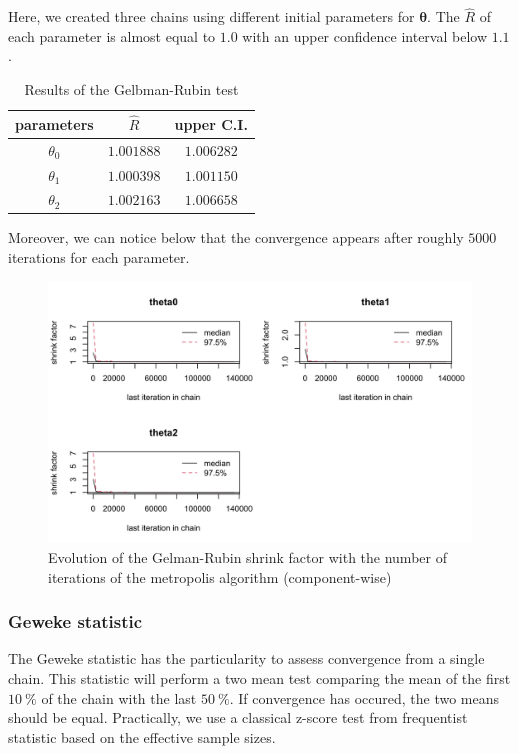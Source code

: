 Here, we created three chains using different initial parameters for $\bm{\theta}$. The $\hat{R}$ of each parameter is almost equal to $1.0$ with an upper confidence interval below $1.1$.

\begin{table}[H]
	\centering\begin{tabular}{|c|c|c|} \hline 
		parameters & $\hat{R}$ & upper C.I. \\ \hline
		$\theta_0$ & $1.001888$ & $1.006282$ \\
		$\theta_1$ & $1.000398$ & $1.001150$ \\
		$\theta_2$ & $1.002163$ & $1.006658$ \\ \hline
	\end{tabular}
	\caption{Results of the Gelbman-Rubin test}
	\label{tab:metropolis-cw-gelman-rubin}
\end{table}

Moreover, we can notice below that the convergence appears after roughly $5000$ iterations for each parameter.

\begin{figure}[H]
	\centering
	\includegraphics{figures/metropolis_cw/metropolis_cw_gelman-plot.png}
	\caption{Evolution of the Gelman-Rubin shrink factor with the number of iterations of the metropolis algorithm (component-wise)}
	\label{<label>}
\end{figure}

\subsubsection*{Geweke statistic}

The Geweke statistic has the particularity to assess convergence from a single chain. This statistic will perform a two mean test comparing the mean of the first $\SI{10}{\percent}$ of the chain with the last $\SI{50}{\percent}$. If convergence has occured, the two means should be equal. Practically, we use a classical z-score test from frequentist statistic based on the effective sample sizes.

